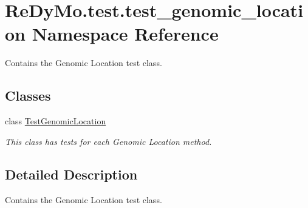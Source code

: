 \hypertarget{namespaceReDyMo_1_1test_1_1test__genomic__location}{}\section{Re\+Dy\+Mo.\+test.\+test\+\_\+genomic\+\_\+location Namespace Reference}
\label{namespaceReDyMo_1_1test_1_1test__genomic__location}


Contains the Genomic Location test class.  


\subsection*{Classes}
\begin{DoxyCompactItemize}
\item 
class \mbox{\hyperlink{classReDyMo_1_1test_1_1test__genomic__location_1_1TestGenomicLocation}{Test\+Genomic\+Location}}
\begin{DoxyCompactList}\small\item\em This class has tests for each Genomic Location method. \end{DoxyCompactList}\end{DoxyCompactItemize}


\subsection{Detailed Description}
Contains the Genomic Location test class. 